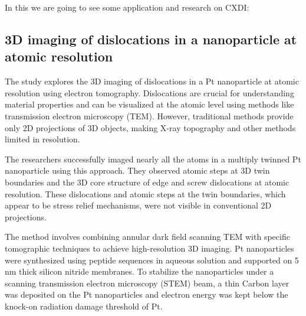 \documentclass[12pt, a4paper, twocolumn]{article}
\begin{document}
	In this we are going to see some application and research on CXDI:\par
	\vspace*{10pt}
\begin{minipage}{0.5\textwidth}
	

\end{minipage}

\subsection{3D imaging of dislocations in a nanoparticle at atomic resolution}
The study explores the 3D imaging of dislocations in a Pt nanoparticle at atomic resolution using electron tomography. Dislocations are crucial for understanding material properties and can be visualized at the atomic level using methods like transmission electron microscopy (TEM). However, traditional methods provide only 2D projections of 3D objects, making X-ray topography and other methods limited in resolution.\par
The researchers successfully imaged nearly all the atoms in a multiply twinned Pt nanoparticle using this approach. They observed atomic steps at 3D twin boundaries and the 3D core structure of edge and screw dislocations at atomic resolution. These dislocations and atomic steps at the twin boundaries, which appear to be stress relief mechanisms, were not visible in conventional 2D projections.\par
The method involves combining annular dark field scanning TEM with specific tomographic techniques to achieve high-resolution 3D imaging. Pt nanoparticles were synthesized using peptide sequences in aqueous solution and supported on 5 nm thick silicon nitride membranes. To stabilize the nanoparticles under a scanning transmission electron microscopy (STEM) beam, a thin Carbon layer was deposited on the Pt nanoparticles and electron energy was kept below the knock-on radiation damage threshold of Pt.
\end{document}
